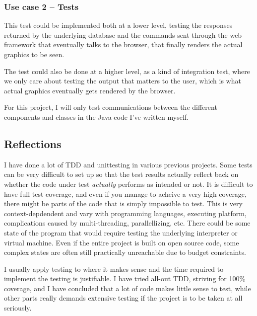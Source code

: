 \subsubsection{Use case 2 -- Tests}
This test could be implemented both at a lower level, testing the responses
returned by the underlying database and the commands sent through the 
web framework that eventually talks to the browser, that finally renders the
actual graphics to be seen.

The test could also be done at a higher level, as a kind of integration test,
where we only care about testing the output that matters to the user, which is
what actual graphics eventually gets rendered by the browser.

For this project, I will only test communications between the different 
components and classes in the Java code I've written myself.


\subsection{Reflections}\label{task-2-reflect}
I have done a lot of TDD and unittesting in various previous projects.  Some
tests can be very difficult to set up so that the test results actually reflect
back on whether the code under test \emph{actually} performs as intended or
not. It is difficult to have full test coverage\cite{wiki:code-coverage}, and
even if you manage to acheive a very high coverage, there might be parts of the
code that is simply impossible to test. This is very context-depdendent and
vary with programming languages, executing platform, complications caused by
multi-threading, parallellizing, etc. There could be some state of the program
that would require testing the underlying interpreter or virtual machine. Even
if the entire project is built on open source code, some complex states are
often still practically unreachable due to budget constraints.

I usually apply testing to where it makes sense and the time required to
implement the testing is justifiable. I have tried all-out TDD, striving for
100\% coverage, and I have concluded that a lot of code makes little sense to
test, while other parts really demands extensive testing if the project is to
be taken at all seriously.


